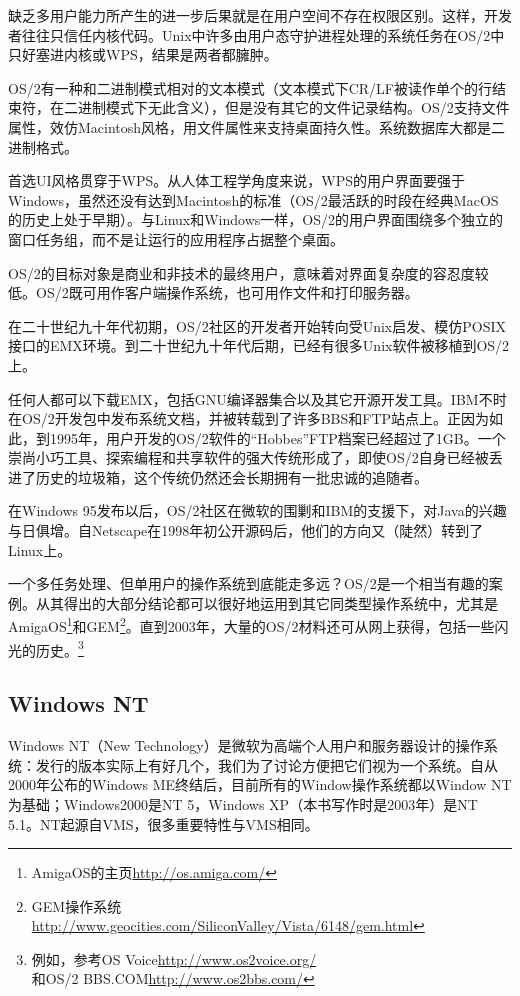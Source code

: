 \documentclass[12pt,oneside]{ctexbook}
\begin{document}
\begin{common-format}
缺乏多用户能力所产生的进一步后果就是在用户空间不存在权限区别。这样，开发者往往只信任内核代码。Unix中许多由用户态守护进程处理的系统任务在OS/2中只好塞进内核或WPS，结果是两者都臃肿。

OS/2有一种和二进制模式相对的文本模式（文本模式下CR/LF被读作单个的行结束符，在二进制模式下无此含义），但是没有其它的文件记录结构。OS/2支持文件属性，效仿Macintosh风格，用文件属性来支持桌面持久性。系统数据库大都是二进制格式。

首选UI风格贯穿于WPS。从人体工程学角度来说，WPS的用户界面要强于Windows，虽然还没有达到Macintosh的标准（OS/2最活跃的时段在经典MacOS的历史上处于早期）。与Linux和Windows一样，OS/2的用户界面围绕多个独立的窗口任务组，而不是让运行的应用程序占据整个桌面。

OS/2的目标对象是商业和非技术的最终用户，意味着对界面复杂度的容忍度较低。OS/2既可用作客户端操作系统，也可用作文件和打印服务器。

在二十世纪九十年代初期，OS/2社区的开发者开始转向受Unix启发、模仿POSIX接口的EMX环境。到二十世纪九十年代后期，已经有很多Unix软件被移植到OS/2上。

任何人都可以下载EMX，包括GNU编译器集合以及其它开源开发工具。IBM不时在OS/2开发包中发布系统文档，并被转载到了许多BBS和FTP站点上。正因为如此，到1995年，用户开发的OS/2软件的“Hobbes”FTP档案已经超过了1GB。一个崇尚小巧工具、探索编程和共享软件的强大传统形成了，即使OS/2自身已经被丢进了历史的垃圾箱，这个传统仍然还会长期拥有一批忠诚的追随者。

在Windows 95发布以后，OS/2社区在微软的围剿和IBM的支援下，对Java的兴趣与日俱增。自Netscape在1998年初公开源码后，他们的方向又（陡然）转到了Linux上。

一个多任务处理、但单用户的操作系统到底能走多远？OS/2是一个相当有趣的案例。从其得出的大部分结论都可以很好地运用到其它同类型操作系统中，尤其是AmigaOS\footnote{AmigaOS的主页\href{http://os.amiga.com/}{http://os.amiga.com/}}和GEM\footnote{GEM操作系统\\ \href{http://www.geocities.com/SiliconValley/Vista/6148/gem.html}{http://www.geocities.com/SiliconValley/Vista/6148/gem.html}}。直到2003年，大量的OS/2材料还可从网上获得，包括一些闪光的历史。\footnote{例如，参考OS Voice\href{http://www.os2voice.org/}{http://www.os2voice.org/}\\和OS/2 BBS.COM\href{http://www.os2bbs.com/}{http://www.os2bbs.com/}}


\subsection{Windows NT}
Windows NT（New Technology）是微软为高端个人用户和服务器设计的操作系统：发行的版本实际上有好几个，我们为了讨论方便把它们视为一个系统。自从2000年公布的Windows ME终结后，目前所有的Window操作系统都以Window NT为基础；Windows2000是NT 5，Windows XP（本书写作时是2003年）是NT 5.1。NT起源自VMS，很多重要特性与VMS相同。


\end{common-format}
\end{document}
